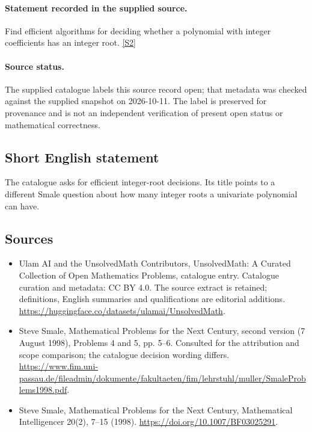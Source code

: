 \documentclass[11pt]{article}
\begin{document}
\paragraph{Statement recorded in the supplied source.}
Find efficient algorithms for deciding whether a polynomial with integer coefficients has an integer root. \href{https://www.fim.uni-passau.de/fileadmin/dokumente/fakultaeten/fim/lehrstuhl/muller/SmaleProblems1998.pdf}{[S2]}
\paragraph{Source status.}
The supplied catalogue labels this source record open; that metadata was checked against the supplied snapshot on 2026-10-11. The label is preserved for provenance and is not an independent verification of present open status or mathematical correctness.
\subsection{Short English statement}
The catalogue asks for efficient integer-root decisions. Its title points to a different Smale question about how many integer roots a univariate polynomial can have.
\subsection{Sources}
\begin{itemize}
\item[S1] Ulam AI and the UnsolvedMath Contributors, UnsolvedMath: A Curated Collection of Open Mathematics Problems, catalogue entry. Catalogue curation and metadata: CC BY 4.0. The source extract is retained; definitions, English summaries and qualifications are editorial additions.
\url{https://huggingface.co/datasets/ulamai/UnsolvedMath}.
\item[S2] Steve Smale, Mathematical Problems for the Next Century, second version (7 August 1998), Problems 4 and 5, pp. 5--6. Consulted for the attribution and scope comparison; the catalogue decision wording differs.
\url{https://www.fim.uni-passau.de/fileadmin/dokumente/fakultaeten/fim/lehrstuhl/muller/SmaleProblems1998.pdf}.
\item[S3] Steve Smale, Mathematical Problems for the Next Century, Mathematical Intelligencer 20(2), 7--15 (1998).
\url{https://doi.org/10.1007/BF03025291}.
\end{itemize}
\end{document}
